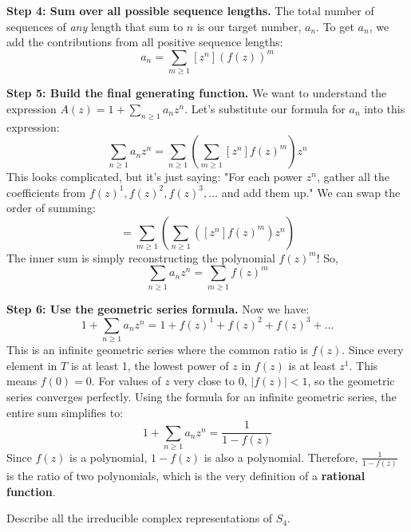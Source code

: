 \begin{solution}
\textbf{Step 4: Sum over all possible sequence lengths.}
The total number of sequences of \textit{any} length that sum to $n$ is our target number, $a_n$.
To get $a_n$, we add the contributions from all positive sequence lengths:
\[ a_n = \sum_{m \geq 1} [z^n] (f(z))^m \]

\textbf{Step 5: Build the final generating function.}
We want to understand the expression $A(z) = 1 + \sum_{n \geq 1} a_n z^n$.
Let's substitute our formula for $a_n$ into this expression:
\[ \sum_{n \geq 1} a_n z^n = \sum_{n \geq 1} \left( \sum_{m \geq 1} [z^n] f(z)^m \right) z^n \]
This looks complicated, but it's just saying: "For each power $z^n$, gather all the coefficients from $f(z)^1, f(z)^2, f(z)^3, \dots$ and add them up."
We can swap the order of summing:
\[ = \sum_{m \geq 1} \left( \sum_{n \geq 1} ([z^n] f(z)^m) z^n \right) \]
The inner sum is simply reconstructing the polynomial $f(z)^m$! So,
\[ \sum_{n \geq 1} a_n z^n = \sum_{m \geq 1} f(z)^m \]

\textbf{Step 6: Use the geometric series formula.}
Now we have:
\[ 1 + \sum_{n \geq 1} a_n z^n = 1 + f(z)^1 + f(z)^2 + f(z)^3 + \dots \]
This is an infinite geometric series where the common ratio is $f(z)$.
Since every element in $T$ is at least 1, the lowest power of $z$ in $f(z)$ is at least $z^1$. This means $f(0) = 0$. For values of $z$ very close to 0, $|f(z)| < 1$, so the geometric series converges perfectly.
Using the formula for an infinite geometric series, the entire sum simplifies to:
\[ 1 + \sum_{n \geq 1} a_n z^n = \frac{1}{1 - f(z)} \]
Since $f(z)$ is a polynomial, $1 - f(z)$ is also a polynomial. Therefore, $\frac{1}{1 - f(z)}$ is the ratio of two polynomials, which is the very definition of a \textbf{rational function}.
\end{solution}

\begin{exercise}
\label{algebra:2010:6}
Describe all the irreducible complex representations of $S_4$.
\end{exercise}

